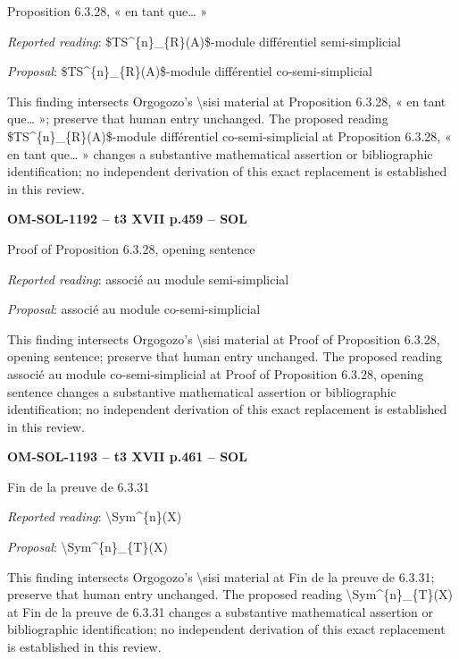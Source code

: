 Proposition 6.3.28, « en tant que… »\par
\emph{Reported reading}: \$TS\textasciicircum{}\{n\}\_\{R\}(A)\$-module différentiel semi-simplicial\par
\emph{Proposal}: \$TS\textasciicircum{}\{n\}\_\{R\}(A)\$-module différentiel co-semi-simplicial\par
This finding intersects Orgogozo's \textbackslash{}sisi material at Proposition 6.3.28, « en tant que… »; preserve that human entry unchanged. The proposed reading \$TS\textasciicircum{}\{n\}\_\{R\}(A)\$-module différentiel co-semi-simplicial at Proposition 6.3.28, « en tant que… » changes a substantive mathematical assertion or bibliographic identification; no independent derivation of this exact replacement is established in this review.\par
\par\noindent\textbf{OM-SOL-1192 -- t3 XVII p.459 -- SOL}\par
Proof of Proposition 6.3.28, opening sentence\par
\emph{Reported reading}: associé au module semi-simplicial\par
\emph{Proposal}: associé au module co-semi-simplicial\par
This finding intersects Orgogozo's \textbackslash{}sisi material at Proof of Proposition 6.3.28, opening sentence; preserve that human entry unchanged. The proposed reading associé au module co-semi-simplicial at Proof of Proposition 6.3.28, opening sentence changes a substantive mathematical assertion or bibliographic identification; no independent derivation of this exact replacement is established in this review.\par
\par\noindent\textbf{OM-SOL-1193 -- t3 XVII p.461 -- SOL}\par
Fin de la preuve de 6.3.31\par
\emph{Reported reading}: \textbackslash{}Sym\textasciicircum{}\{n\}(X)\par
\emph{Proposal}: \textbackslash{}Sym\textasciicircum{}\{n\}\_\{T\}(X)\par
This finding intersects Orgogozo's \textbackslash{}sisi material at Fin de la preuve de 6.3.31; preserve that human entry unchanged. The proposed reading \textbackslash{}Sym\textasciicircum{}\{n\}\_\{T\}(X) at Fin de la preuve de 6.3.31 changes a substantive mathematical assertion or bibliographic identification; no independent derivation of this exact replacement is established in this review.\par
